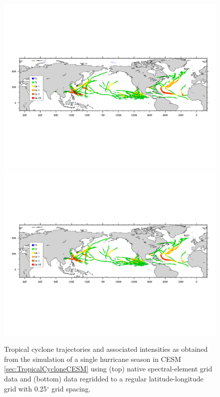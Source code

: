 \documentclass[gmdd, hvmath, online]{copernicus_discussions}
\begin{document}
\begin{figure}[H]
\begin{center}
\includegraphics[clip, trim=0.2cm 6.6cm 0.2cm 7.1cm, width=5in]{nhemi-traj_plotted.pdf}
\includegraphics[clip, trim=0.2cm 6.8cm 0.2cm 7.1cm, width=5in]{nhemi_regrid-traj_plotted.pdf}
\end{center}
\caption{Tropical cyclone trajectories and associated intensities as obtained from the simulation of a single hurricane season in CESM \ref{sec:TropicalCycloneCESM} using (top) native spectral-element grid data and (bottom) data regridded to a regular latitude-longitude grid with 0.25$^\circ$ grid spacing.} \label{fig:TropicalCycloneCESM}
\end{figure}
\end{document}
